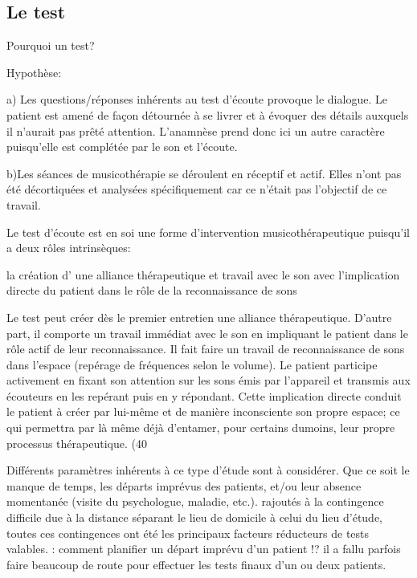 \subsection{Le test}

Pourquoi un test?

Hypothèse:





a) Les questions/réponses inhérents au 
 test d'écoute provoque le dialogue. Le patient est amené de façon
 détournée à se livrer et à évoquer des détails auxquels il
 n'aurait pas prêté attention. L'anamnèse prend donc ici un autre
 caractère puisqu'elle est complétée par le son et l'écoute.

 b)Les séances de musicothérapie se déroulent en
réceptif et actif. Elles n'ont pas été décortiquées et analysées
spécifiquement car ce n'était pas l'objectif de ce travail.		
        
 Le test d'écoute est en soi une forme d'intervention
 musicothérapeutique puisqu'il 
 a deux rôles intrinsèques:

 la création d' une alliance thérapeutique et
     travail avec le son avec l'implication directe du
     patient dans le rôle de la 
     reconnaissance de sons
   
 Le test peut créer dès le premier entretien une alliance thérapeutique.
 D'autre part, il comporte un travail immédiat avec le son en impliquant le patient
 dans le rôle actif de leur reconnaissance. Il fait faire un travail de reconnaissance de sons dans
 l'espace (repérage de fréquences selon le volume). Le patient
 participe activement en fixant son attention sur les
 sons émis par l'appareil et transmis aux écouteurs en les repérant
  puis en y
 répondant. Cette implication directe conduit le patient à créer par lui-même et de manière
 inconsciente  
 son propre espace; ce  qui permettra par là même déjà d'entamer, pour certains dumoins, leur propre
 processus thérapeutique. (40%

Différents paramètres inhérents à ce type d'étude sont à
considérer. Que ce soit le manque de temps, les départs imprévus des patients, et/ou leur
absence momentanée (visite du psychologue, maladie, etc.). rajoutés à la
contingence difficile due à la distance séparant le lieu de domicile à
celui du lieu d'étude, toutes ces contingences ont été les principaux facteurs réducteurs de
tests valables.
: comment planifier un départ imprévu d'un patient !? il a fallu parfois
faire beaucoup de route pour effectuer les tests finaux d'un ou deux
patients.
  
